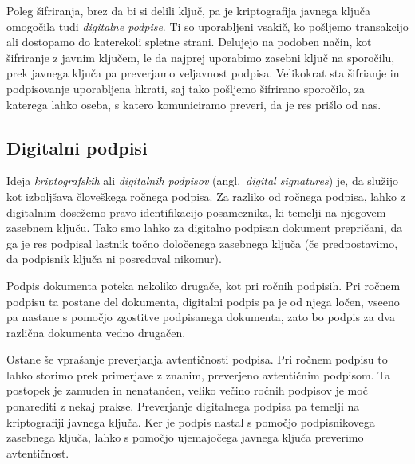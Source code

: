 \documentclass[isrm2, tisk]{fmfdelo}
\begin{document}
Poleg šifriranja, brez da bi si delili ključ, pa je kriptografija javnega ključa omogočila tudi 
\textit{digitalne podpise}. Ti so uporabljeni vsakič, ko pošljemo transakcijo ali dostopamo do katerekoli 
spletne strani. Delujejo na podoben način, kot šifriranje z javnim ključem, le da najprej uporabimo 
zasebni ključ na sporočilu, prek javnega ključa pa preverjamo veljavnost podpisa. Velikokrat sta šifrianje 
in podpisovanje uporabljena hkrati, saj tako pošljemo šifrirano sporočilo, za katerega lahko oseba,
s katero komuniciramo preveri, da je res prišlo od nas.

\subsection{Digitalni podpisi}
Ideja \textit{kriptografskih} ali \textit{digitalnih podpisov} (angl.\ \textit{digital signatures}) je, 
da služijo kot izboljšava človeškega ročnega podpisa. Za razliko od ročnega podpisa, lahko z digitalnim 
dosežemo pravo identifikacijo posameznika, ki temelji na njegovem zasebnem ključu. Tako smo lahko 
za digitalno podpisan dokument prepričani, da ga je res podpisal lastnik točno določenega zasebnega ključa
(če predpostavimo, da podpisnik ključa ni posredoval nikomur). 

Podpis dokumenta poteka nekoliko drugače, kot pri ročnih podpisih. Pri ročnem podpisu ta postane del 
dokumenta, digitalni podpis pa je od njega ločen, vseeno pa nastane s pomočjo zgostitve podpisanega 
dokumenta, zato bo podpis za dva različna dokumenta vedno drugačen.

Ostane še vprašanje preverjanja avtentičnosti podpisa. Pri ročnem podpisu to lahko storimo prek 
primerjave z znanim, preverjeno avtentičnim podpisom. Ta postopek je zamuden in nenatančen, veliko 
večino ročnih podpisov je moč ponarediti z nekaj prakse. Preverjanje digitalnega podpisa pa temelji 
na kriptografiji javnega ključa. Ker je podpis nastal s pomočjo podpisnikovega zasebnega ključa,
lahko s pomočjo ujemajočega javnega ključa preverimo avtentičnost.
\end{document}
